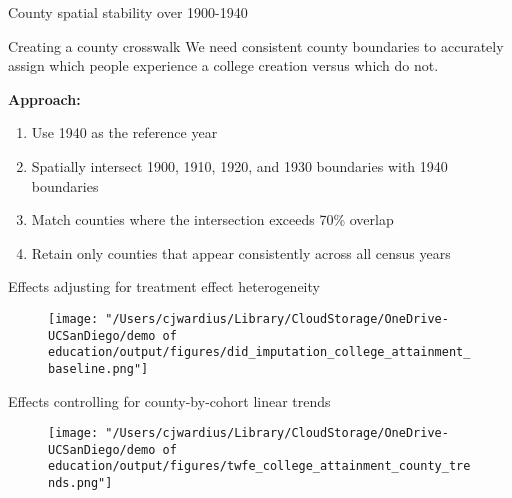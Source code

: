 \documentclass[notes,11pt, aspectratio=169]{beamer}
\begin{document}
\appendix
{}

\begin{frame}[label=spatialstability]{County spatial stability over 1900-1940}
    

    \vspace{1em}
    \centering
    \hyperlink{isolating}{}
\end{frame}


\begin{frame}[label=countycrosswalk]{Creating a county crosswalk}
We need consistent county boundaries to accurately assign which people experience a college creation versus which do not.
\vspace{.5cm}

\textbf{Approach:}
\begin{enumerate}
\item Use 1940 as the reference year
\item Spatially intersect 1900, 1910, 1920, and 1930 boundaries with 1940 boundaries
\item Match counties where the intersection exceeds 70\% overlap
\item Retain only counties that appear consistently across all census years
\end{enumerate}
\vspace{1em}
\centering
\hyperlink{isolating}{}
\end{frame}


\begin{frame}[label=borusyak]{Effects adjusting for treatment effect heterogeneity \cite{borusyakRevisitingEventStudyDesigns2024}}
  \begin{figure}
        \centering
        \texttt{[image: "/Users/cjwardius/Library/CloudStorage/OneDrive-UCSanDiego/demo of education/output/figures/did\_imputation\_college\_attainment\_baseline.png"]}
    \end{figure}
    \centering
    \hyperlink{robustness}{}
\end{frame}


\begin{frame}[label=county_trends]{Effects controlling for county-by-cohort linear trends}
  \begin{figure}
        \centering
        \texttt{[image: "/Users/cjwardius/Library/CloudStorage/OneDrive-UCSanDiego/demo of education/output/figures/twfe\_college\_attainment\_county\_trends.png"]}
    \end{figure}
    \centering
    \hyperlink{robustness}{}
\end{frame}
\end{document}
